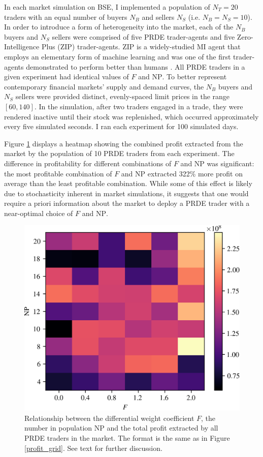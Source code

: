 \documentclass[a4paper,twoside]{article}
\begin{document}
In each market simulation on BSE, I implemented a population of $N_T=20$ traders with an equal number of buyers $N_B$ and sellers $N_S$ (i.e. $N_B=N_S=10$).
In order to introduce a form of heterogeneity into the market, each of the $N_B$ buyers and $N_S$ sellers were comprised of five PRDE trader-agents and five Zero-Intelligence Plus (ZIP) \cite{ZIP} trader-agents.
ZIP is a widely-studied MI agent that employs an elementary form of machine learning and was one of the first trader-agents demonstrated to perform better than humans \cite{DasHansonKephartTesauro}.
All PRDE traders in a given experiment had identical values of $F$ and $\mathrm{NP}$.
To better represent contemporary financial markets' supply and demand curves, the $N_B$ buyers and $N_S$ sellers were provided distinct, evenly-spaced limit prices in the range $[60, 140]$.
In the simulation, after two traders engaged in a trade, they were rendered inactive until their stock was replenished, which occurred approximately every five simulated seconds.
I ran each experiment for 100 simulated days.

Figure \ref{zip_profit_grid} displays a heatmap showing the combined profit extracted from the market by the population of 10 PRDE traders from each experiment.
The difference in profitability for different combinations of $F$ and $\mathrm{NP}$ was significant: the most profitable combination of $F$ and $\mathrm{NP}$ extracted 322\% more profit on average than the least profitable combination.
While some of this effect is likely due to stochasticity inherent in market simulations, it suggests that one would require a priori information about the market to deploy a PRDE trader with a near-optimal choice of $F$ and $\mathrm{NP}$.

\begin{figure}[htbp]
    \centerline{\includegraphics[width=\columnwidth]{zip_profit_grid.png}}
    \caption{
        Relationship between the differential weight coefficient $F$, the number in population $\mathrm{NP}$ and the total profit extracted by all PRDE traders in the market.
        The format is the same as in Figure \ref{profit_grid}.
        See text for further discussion.
    }
    \label{zip_profit_grid}
\end{figure}
\end{document}
